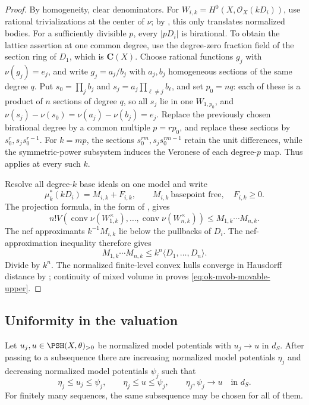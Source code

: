 \begin{proof}
By homogeneity, clear denominators.  For
$W_{i,k}=H^0(X,\mathcal O_X(kD_i))$, use rational trivializations at the
center of $\nu$; by , this only
translates normalized bodies.  For a sufficiently divisible $p$, every
$|pD_i|$ is birational.  To obtain the lattice assertion at one common
degree, use the degree-zero fraction field of the section ring of $D_1$,
which is $\mathbf C(X)$.  Choose rational functions $g_j$ with
$\nu(g_j)=e_j$, and write $g_j=a_j/b_j$ with $a_j,b_j$ homogeneous
sections of the same degree $q$.  Put $s_0=\prod_jb_j$ and
$s_j=a_j\prod_{\ell\ne j}b_\ell$, and set $p_0=nq$: each of these is a
product of $n$ sections of degree $q$, so all $s_j$ lie in one
$W_{1,p_0}$, and $\nu(s_j)-\nu(s_0)=\nu(a_j)-\nu(b_j)=e_j$.  Replace the previously chosen
birational degree by a common multiple $p=rp_0$, and replace these sections by
$s_0^r,s_js_0^{r-1}$.  For $k=mp$, the sections
$s_0^{rm},s_js_0^{rm-1}$ retain the unit differences, while the
symmetric-power subsystem induces the Veronese of each degree-$p$ map.
Thus  applies at every such $k$.

Resolve all degree-$k$ base ideals on one model and write
\[
 \mu_k^*(kD_i)=M_{i,k}+F_{i,k},\qquad
 M_{i,k}\ \text{basepoint free},\quad F_{i,k}\geq0.
\]
The projection formula, in the form of , gives
\[
 n!V(\operatorname{conv}\nu(W_{1,k}^\times),\ldots,
      \operatorname{conv}\nu(W_{n,k}^\times))
 \leq M_{1,k}\cdots M_{n,k}.
\]
The nef approximants $k^{-1}M_{i,k}$ lie below the pullbacks of $D_i$.
The nef-approximation inequality
\cite[Propositions~2.12 and~2.13]{BFJ09} therefore gives
\[
 M_{1,k}\cdots M_{n,k}
 \leq k^n\langle D_1,\ldots,D_n\rangle.
\]
Divide by $k^n$.  The normalized finite-level convex hulls converge in
Hausdorff distance by \cite[Proposition~10.3.4]{XiaBook}; continuity of
mixed volume in  proves
\eqref{eq:ok-mvob-movable-upper}.
\end{proof}

\subsection{Uniformity in the valuation}
\label{sec:ok-mixed-uniform}

\begin{lemma}\label{lem:ok-mvob-potential-sandwich}
Let $u_j,u\in\PSH(X,\theta)_{>0}$ be normalized model potentials with
$u_j\to u$ in $d_S$.  After passing to a subsequence there are
increasing normalized model potentials $\eta_j$ and decreasing normalized
model potentials $\psi_j$ such that
\[
 \eta_j\leq u_j\leq\psi_j,\qquad
 \eta_j\leq u\leq\psi_j,\qquad
 \eta_j,\psi_j\longrightarrow u\quad\text{in }d_S.
\tag{55.37}\label{eq:ok-mvob-potential-sandwich}
\]
For finitely many sequences, the same subsequence may be chosen for all of
them.
\end{lemma}

